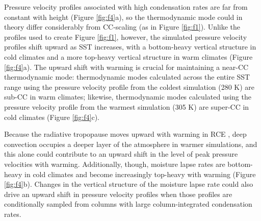 \documentclass[twocol]{ametsoc}
\begin{document}
Pressure velocity profiles associated with high condensation rates are far from constant with height (Figure \ref{fig:f4}a), so the thermodynamic mode could in theory differ considerably from CC-scaling (as in Figure \ref{fig:f1}).  Unlike the profiles used to create Figure \ref{fig:f1}, however, the simulated pressure velocity profiles shift upward as SST increases, with a bottom-heavy vertical structure in cold climates and a more top-heavy vertical structure in warm climates (Figure \ref{fig:f4}a). The upward shift with warming is crucial for maintaining a near-CC thermodynamic mode: thermodynamic modes calculated across the entire SST range using the pressure velocity profile from the coldest simulation (280 K) are sub-CC in warm climates; likewise, thermodynamic modes calculated using the pressure velocity profile from the warmest simulation (305 K) are super-CC in cold climates (Figure \ref{fig:f4}c).

Because the radiative tropopause moves upward with warming in RCE \citep{Seeley2019FATInvariant}, deep convection occupies a deeper layer of the atmosphere in warmer simulations, and this alone could contribute to an upward shift in the level of peak pressure velocities with warming. Additionally, though, moisture lapse rates are bottom-heavy in cold climates and become increasingly top-heavy with warming (Figure \ref{fig:f4}b). Changes in the vertical structure of the moisture lapse rate could also drive an upward shift in pressure velocity profiles when those profiles are conditionally sampled from columns with large column-integrated condensation rates.
\end{document}
